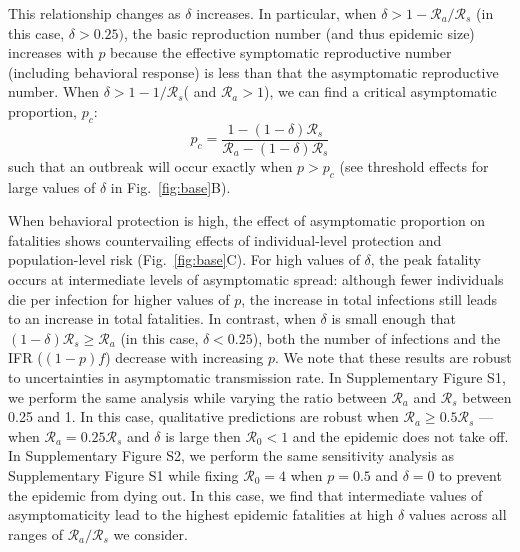 \documentclass[12pt]{article}
\newcommand{\fref}[1]{Fig.~\ref{fig:#1}}
\newcommand{\RR}{\ensuremath{{\mathcal R}}\xspace}
\begin{document}
This relationship changes as $\delta$ increases.
In particular, when $\delta > 1-\RR_a/\RR_s$ (in this case, $\delta > 0.25)$, the basic reproduction number (and thus epidemic size) increases with $p$ because the effective symptomatic reproductive number (including behavioral response) is less than that the asymptomatic reproductive number.
When $\delta > 1-1/\RR_s$( and $\RR_a>1$), we can find a critical asymptomatic proportion, $p_c$:
\begin{equation}
    p_c = \frac{1 - (1-\delta) \RR_s}{\RR_a - (1-\delta) \RR_s}
\end{equation}
such that an outbreak will occur exactly when $p>p_c$ (see threshold effects for large values of $\delta$ in \fref{base}B).

When behavioral protection is high, the effect of asymptomatic proportion on fatalities shows countervailing effects of individual-level protection and population-level risk (\fref{base}C).
For high values of $\delta$, the peak fatality occurs at intermediate levels of asymptomatic spread:
although fewer individuals die per infection for higher values of $p$, the increase in total infections still leads to an increase in total fatalities.
In contrast, when $\delta$ is small enough that $(1-\delta) \RR_s \geq \RR_a$ (in this case, $\delta < 0.25$), both the number of infections and the IFR ($(1-p)f$) decrease with increasing $p$.
We note that these results are robust to uncertainties in asymptomatic transmission rate.
In Supplementary Figure S1, we perform the same analysis while varying the ratio between $\RR_a$ and $\RR_s$ between 0.25 and 1.
In this case, qualitative predictions are robust when $\RR_a \geq 0.5 \RR_s$
--- when $\RR_a = 0.25 \RR_s$ and $\delta$ is large then $\RR_0 < 1$ and the epidemic does not take off.
In Supplementary Figure S2, we perform the same sensitivity analysis as Supplementary Figure S1 while fixing $\RR_0 = 4$ when $p=0.5$ and $\delta=0$ to prevent the epidemic from dying out. In this case, we find that intermediate values of asymptomaticity lead to the highest epidemic fatalities at high $\delta$ values across all ranges of $\RR_a/\RR_s$ we consider.
\end{document}
